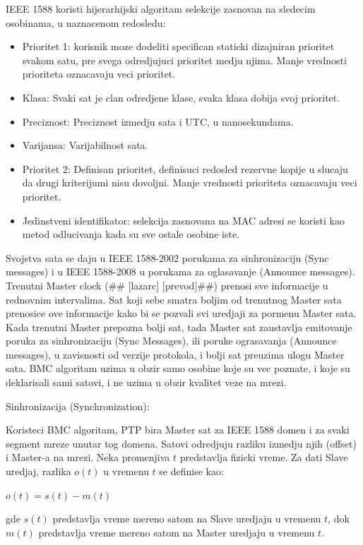 \documentclass[a4paper,12pt, master]{etf}
\begin{document}
	IEEE 1588 koristi hijerarhijski algoritam selekcije zasnovan na sledecim osobinama, u 
	naznacenom redosledu:

	\begin{itemize}
		\item Prioritet 1: korisnik moze dodeliti specifican staticki dizajniran prioritet 
		svakom satu, pre svega odredjujuci prioritet medju njima. Manje vrednosti prioriteta 
		oznacavaju veci prioritet.
		\item Klasa: Svaki sat je clan odredjene klase, svaka klasa dobija svoj prioritet.
		\item Preciznost: Preciznost izmedju sata i UTC, u nanosekundama.
		\item Varijansa: Varijabilnost sata.
		\item Prioritet 2: Definisan prioritet, definisuci redosled rezervne kopije u slucaju da 
		drugi kriterijumi nisu dovoljni. Manje vrednosti prioriteta oznacavaju veci prioritet.
		\item Jedinstveni identifikator: selekcija zasnovana na MAC adresi se koristi kao metod 
		odlucivanja kada su sve ostale osobine iste.
	\end{itemize}

	Svojstva sata se daju u IEEE 1588-2002 porukama za sinhronizaciju (Sync messages) i u 
	IEEE 1588-2008 u porukama za oglasavanje (Announce messages). Trenutni Master clock (\#\#
	[lazarc] [prevod]\#\#) prenosi sve informacije u rednovnim intervalima. Sat koji sebe 
	smatra boljim od trenutnog Master sata prenosice ove informacije kako bi se pozvali svi 
	uredjaji za pormenu Master sata. Kada trenutni Master prepozna bolji sat, tada Master sat 
	zaustavlja emitovanje poruka za sinhronizaciju (Sync Messages), ili poruke ograsavanja 
	(Announce messages), u zavisnosti od verzije protokola, i bolji sat preuzima ulogu Master 
	sata. BMC algoritam uzima u obzir samo osobine koje su vec poznate, i koje su deklarisali 
	sami satovi, i ne uzima u obzir kvalitet veze na mrezi.

	Sinhronizacija (Synchronization):

	Koristeci BMC algoritam, PTP bira Master sat za IEEE 1588 domen i za svaki segment mreze 
	unutar tog domena. Satovi odredjuju razliku izmedju njih (offset) i Master-a na mrezi. Neka 
	promenjiva $t$ predstavlja fizicki vreme. Za dati Slave uredjaj, razlika $o(t)$ u vremenu 
	$t$ se definise kao:

	$o(t) = s(t) - m(t)$
	
	gde $s(t)$ predstavlja vreme mereno satom na Slave uredjaju u vremenu $t$, dok $m(t)$ 
	predstavlja vreme mereno satom na Master uredjaju u vremenu $t$.
\end{document}
